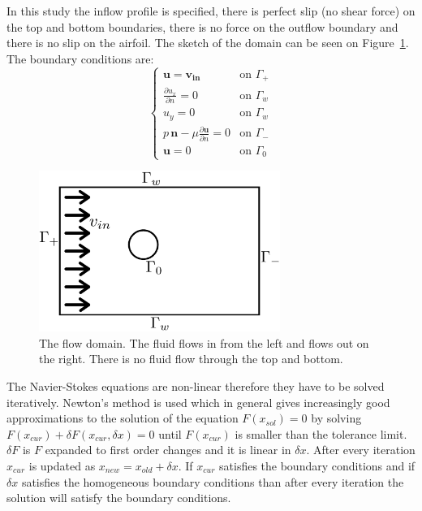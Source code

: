 \documentclass[12pt, a4paper]{article}
\begin{document}
        In this study the inflow profile is specified, there is perfect slip (no shear force) on the top and bottom boundaries, there is no force on the outflow boundary and there is no slip on the airfoil. The sketch of the domain can be seen on Figure~\ref{flow_domain}. The boundary conditions are:
        \begin{equation} \label{flow_boundary_conditions}
        \begin{cases}
            \mathbf{u} = \mathbf{v_{in}} & \text{on } \Gamma_+ \\
            \frac{\partial u_x}{\partial n} = 0 & \text{on } \Gamma_w \\
            u_y = 0  & \text{on } \Gamma_w \\
            p \, \mathbf{n} - \mu \frac{\partial \mathbf{u}}{\partial n} = 0 & \text{on } \Gamma_- \\
            \mathbf{u} = 0 & \text{on } \Gamma_0
        \end{cases}
        \end{equation}
        \begin{figure}[htbp]
            \centering
            \includegraphics[width=0.7\textwidth]{domain_vector_2}
            \caption{The flow domain. The fluid flows in from the left and flows out on the right. There is no fluid flow through the top and bottom.}
            \label{flow_domain}
        \end{figure}
        
        The Navier-Stokes equations are non-linear therefore they have to be solved iteratively. Newton's method is used which in general gives increasingly good approximations to the solution of the equation $F(x_{sol}) = 0$ by solving $F(x_{cur}) + \delta F(x_{cur}, \delta x) = 0$ until  $F(x_{cur})$ is smaller than the tolerance limit. $\delta F$ is $F$ expanded to first order changes and it is linear in $\delta x$. After every iteration $x_{cur}$ is updated as $x_{new} = x_{old} + \delta x$. If $x_{cur}$ satisfies the boundary conditions and if $\delta x$ satisfies the homogeneous boundary conditions than after every iteration the solution will satisfy the boundary conditions.
        
\end{document}
